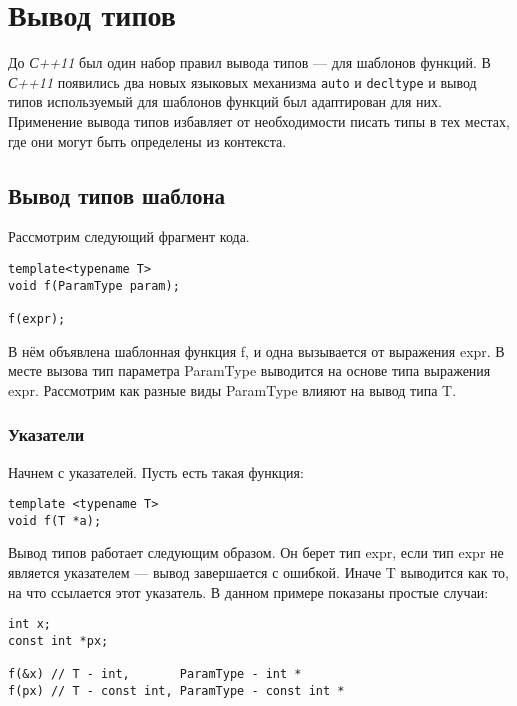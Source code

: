 	\section{Вывод типов}
	До \textit{С++11} был один набор правил вывода типов --- для шаблонов функций. В \textit{С++11} появились два новых языковых механизма \texttt{auto} и \texttt{decltype} и вывод типов используемый для шаблонов функций был адаптирован для них.
	Применение вывода типов избавляет от необходимости писать типы в тех местах, где они могут быть определены из контекста.
	
	\subsection{Вывод типов шаблона}
		Рассмотрим следующий фрагмент кода.
		
\begin{verbatim}
template<typename T>
void f(ParamType param);

f(expr);
\end{verbatim}
        В нём объявлена шаблонная функция f, и одна вызывается от выражения expr. В месте вызова тип параметра ParamType выводится на основе типа выражения expr. Рассмотрим как разные виды ParamType влияют на вывод типа T.

		\subsubsection{Указатели}
		
			Начнем с указателей. Пусть есть такая функция:
\begin{verbatim}
template <typename T>
void f(T *a);
\end{verbatim}
			
			Вывод типов работает следующим образом. Он берет тип expr, если тип expr не является указателем --- вывод завершается с ошибкой. Иначе T выводится как то, на что ссылается этот указатель. В данном примере показаны простые случаи:
\begin{verbatim}
int x;
const int *px;

f(&x) // T - int,       ParamType - int *
f(px) // T - const int, ParamType - const int *
\end{verbatim}
			
